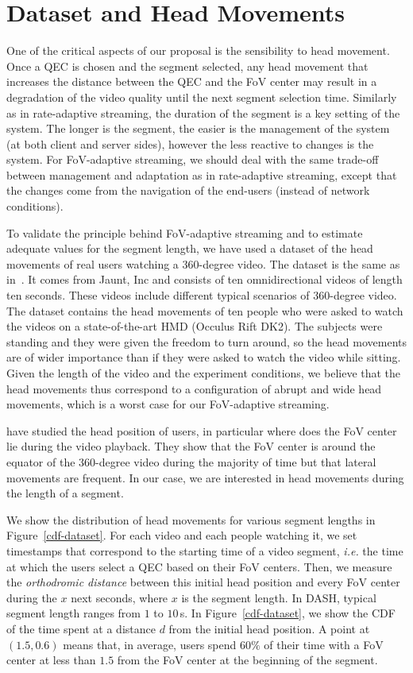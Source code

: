 \section{Dataset and Head Movements}
\label{sec:dataset}

One of the critical aspects of our proposal is the sensibility to head movement. Once a QEC is chosen and the 
segment selected, any head movement that increases the distance between the QEC and the FoV center 
may result in a degradation of the video quality until the next segment selection time. 
Similarly as in rate-adaptive
streaming, the duration of the segment is a key setting of the system. The longer is the segment, the easier is
the management of the system (at both client and server sides), however the less reactive to changes is the system.
For FoV-adaptive streaming, we should deal with the same trade-off between management and adaptation 
as in rate-adaptive streaming,
except that the changes come from 
the navigation of the end-users (instead of network conditions).

To validate the principle behind FoV-adaptive streaming and to estimate adequate values for
the segment length, we have used a dataset of the head movements of real users watching
a 360-degree video. The dataset is the same as in~\cite{yu_framework_2015}. It comes from
Jaunt, Inc and consists of ten omnidirectional videos of length ten seconds. These videos include
different typical scenarios of 360-degree video. The dataset contains the head movements of
ten people who were asked to watch the videos on a state-of-the-art \ac{HMD} (Occulus Rift DK2).
The subjects were standing and they were given the freedom to turn around, so the head movements
are of wider importance than if they were asked to watch the video while sitting. Given the length of
the video and the experiment conditions, we believe that the head movements thus correspond to 
a configuration of abrupt and wide head movements, which is a worst case for our FoV-adaptive streaming.

\citet{yu_framework_2015} have studied the head position of users, in particular where does the FoV center lie 
during the video playback. They show that the FoV center is around the equator of the 360-degree video
during the majority of time but that lateral movements are frequent. In our case, we are interested in head
movements during the length of a segment.

We show the distribution of head movements for various segment lengths in Figure~\ref{cdf-dataset}. 
For each video
and each people watching it, we set timestamps that correspond to the starting time of a video segment,
\textit{i.e.} the time at which the users select a QEC based on their FoV centers.
Then, we measure the \emph{orthodromic distance} between this initial head position and every FoV center
during the $x$ next seconds, where $x$ is the segment length. In \ac{DASH}, typical segment length ranges
from $1$ to $10$\,s. In Figure~\ref{cdf-dataset}, we show the \ac{CDF} of the time spent at a distance
$d$ from the initial head position. A point at $(1.5,0.6)$ means that, in average, users spend $60\%$ of
their time with a FoV center at less than $1.5$ from the FoV center at the beginning of the segment.

